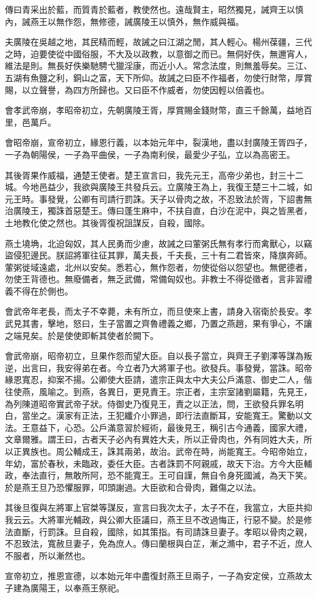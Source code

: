 傳曰青采出於藍，而質青於藍者，教使然也。遠哉賢主，昭然獨見，誡齊王以慎內，誡燕王以無作怨，無修德，誡廣陵王以慎外，無作威與福。

夫廣陵在吳越之地，其民精而輕，故誡之曰江湖之閒，其人輕心。楊州葆疆，三代之時，迫要使從中國俗服，不大及以政教，以意御之而已。無侗好佚，無邇宵人，維法是則。無長好佚樂馳騁弋獵淫康，而近小人。常念法度，則無羞辱矣。三江、五湖有魚鹽之利，銅山之富，天下所仰。故誡之曰臣不作福者，勿使行財幣，厚賞賜，以立聲譽，為四方所歸也。又曰臣不作威者，勿使因輕以倍義也。

會孝武帝崩，孝昭帝初立，先朝廣陵王胥，厚賞賜金錢財幣，直三千餘萬，益地百里，邑萬戶。

會昭帝崩，宣帝初立，緣恩行義，以本始元年中，裂漢地，盡以封廣陵王胥四子，一子為朝陽侯，一子為平曲侯，一子為南利侯，最愛少子弘，立以為高密王。

其後胥果作威福，通楚王使者。楚王宣言曰，我先元王，高帝少弟也，封三十二城。今地邑益少，我欲與廣陵王共發兵云。立廣陵王為上，我復王楚三十二城，如元王時。事發覺，公卿有司請行罰誅。天子以骨肉之故，不忍致法於胥，下詔書無治廣陵王，獨誅首惡楚王。傳曰蓬生麻中，不扶自直，白沙在泥中，與之皆黑者，土地教化使之然也。其後胥復祝詛謀反，自殺，國除。

燕土墝埆，北迫匈奴，其人民勇而少慮，故誡之曰葷粥氏無有孝行而禽獸心，以竊盜侵犯邊民。朕詔將軍往征其罪，萬夫長，千夫長，三十有二君皆來，降旗奔師。葷粥徙域遠處，北州以安矣。悉若心，無作怨者，勿使從俗以怨望也。無俷德者，勿使王背德也。無廢備者，無乏武備，常備匈奴也。非教士不得從徵者，言非習禮義不得在於側也。

會武帝年老長，而太子不幸薨，未有所立，而旦使來上書，請身入宿衛於長安。孝武見其書，擊地，怒曰，生子當置之齊魯禮義之鄉，乃置之燕趙，果有爭心，不讓之端見矣。於是使使即斬其使者於闕下。

會武帝崩，昭帝初立，旦果作怨而望大臣。自以長子當立，與齊王子劉澤等謀為叛逆，出言曰，我安得弟在者。今立者乃大將軍子也。欲發兵。事發覺，當誅。昭帝緣恩寬忍，抑案不揚。公卿使大臣請，遣宗正與太中大夫公戶滿意、御史二人，偕往使燕，風喻之。到燕，各異日，更見責王。宗正者，主宗室諸劉屬籍，先見王，為列陳道昭帝實武帝子狀。侍御史乃復見王，責之以正法，問，王欲發兵罪名明白，當坐之。漢家有正法，王犯纖介小罪過，即行法直斷耳，安能寬王。驚動以文法。王意益下，心恐。公戶滿意習於經術，最後見王，稱引古今通義，國家大禮，文章爾雅。謂王曰，古者天子必內有異姓大夫，所以正骨肉也，外有同姓大夫，所以正異族也。周公輔成王，誅其兩弟，故治。武帝在時，尚能寬王。今昭帝始立，年幼，富於春秋，未臨政，委任大臣。古者誅罰不阿親戚，故天下治。方今大臣輔政，奉法直行，無敢所阿，恐不能寬王。王可自謹，無自令身死國滅，為天下笑。於是燕王旦乃恐懼服罪，叩頭謝過。大臣欲和合骨肉，難傷之以法。

其後旦復與左將軍上官桀等謀反，宣言曰我次太子，太子不在，我當立，大臣共抑我云云。大將軍光輔政，與公卿大臣議曰，燕王旦不改過悔正，行惡不變。於是修法直斷，行罰誅。旦自殺，國除，如其策指。有司請誅旦妻子。孝昭以骨肉之親，不忍致法，寬赦旦妻子，免為庶人。傳曰蘭根與白芷，漸之滫中，君子不近，庶人不服者，所以漸然也。

宣帝初立，推恩宣德，以本始元年中盡復封燕王旦兩子，一子為安定侯，立燕故太子建為廣陽王，以奉燕王祭祀。